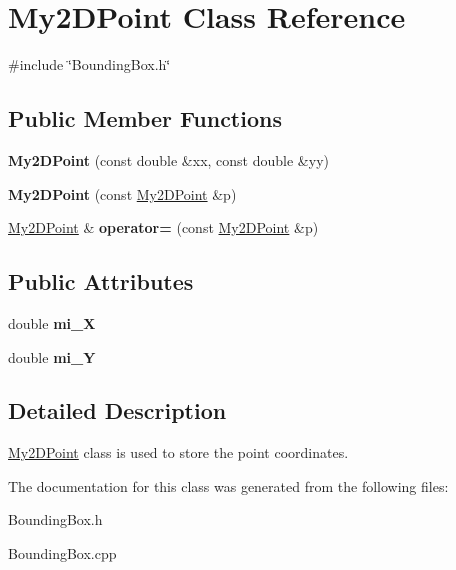 \hypertarget{classMy2DPoint}{
\section{My2DPoint Class Reference}
\label{classMy2DPoint}
}


{\ttfamily \#include \char`\"{}BoundingBox.h\char`\"{}}

\subsection*{Public Member Functions}
\begin{DoxyCompactItemize}
\item 
\hypertarget{classMy2DPoint_a625024d3e1ca0ec8a40479e3ecd91f62}{
{\bfseries My2DPoint} (const double \&xx, const double \&yy)}
\label{classMy2DPoint_a625024d3e1ca0ec8a40479e3ecd91f62}

\item 
\hypertarget{classMy2DPoint_ab07e4cbc4c2880d3eeb8286292f7b8ef}{
{\bfseries My2DPoint} (const \hyperlink{classMy2DPoint}{My2DPoint} \&p)}
\label{classMy2DPoint_ab07e4cbc4c2880d3eeb8286292f7b8ef}

\item 
\hypertarget{classMy2DPoint_af1e5b2795ecad7d9b198db79dd88d2b7}{
\hyperlink{classMy2DPoint}{My2DPoint} \& {\bfseries operator=} (const \hyperlink{classMy2DPoint}{My2DPoint} \&p)}
\label{classMy2DPoint_af1e5b2795ecad7d9b198db79dd88d2b7}

\end{DoxyCompactItemize}
\subsection*{Public Attributes}
\begin{DoxyCompactItemize}
\item 
\hypertarget{classMy2DPoint_ab35881833d7e86c44789e08dd1873e69}{
double {\bfseries mi\_\-X}}
\label{classMy2DPoint_ab35881833d7e86c44789e08dd1873e69}

\item 
\hypertarget{classMy2DPoint_a2118443cacdcd7b85f6ef3a1e57fddcc}{
double {\bfseries mi\_\-Y}}
\label{classMy2DPoint_a2118443cacdcd7b85f6ef3a1e57fddcc}

\end{DoxyCompactItemize}


\subsection{Detailed Description}
\hyperlink{classMy2DPoint}{My2DPoint} class is used to store the point coordinates. 

The documentation for this class was generated from the following files:\begin{DoxyCompactItemize}
\item 
BoundingBox.h\item 
BoundingBox.cpp\end{DoxyCompactItemize}
